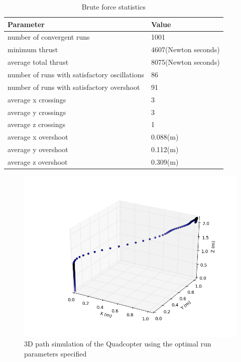 \begin{table}
\label{table:bruteforcestatistics}
\begin{doublespace}
\centering
\begin{tabular}{l l}
Parameter    & Value\\
\hline
number of convergent runs &  1001\\
minimum thrust &  4607(Newton seconds)\\
average total thrust &  8075(Newton seconds)\\
number of runs with satisfactory oscillations &   86\\
number of runs with satisfactory overshoot & 91\\
average x crossings &  3\\
average y crossings &  3\\
average z crossings &  1\\
average x overshoot &  0.088(m)\\
average y overshoot &  0.112(m)\\
average z overshoot &  0.309(m)\\

\hline
\end{tabular}
\end{doublespace}

\caption[Brute force statistics]{Brute force statistics}
\end{table}
\begin{figure}[htbp]
	\centering
		\includegraphics[width=\textwidth]{Figures/optimal_run_3D_path.png}
	\caption[Optimal Run 3D Path]{3D path simulation of the Quadcopter using the optimal run parameters specified}
	\label{fig:optimal run 3D path}
\end{figure}
